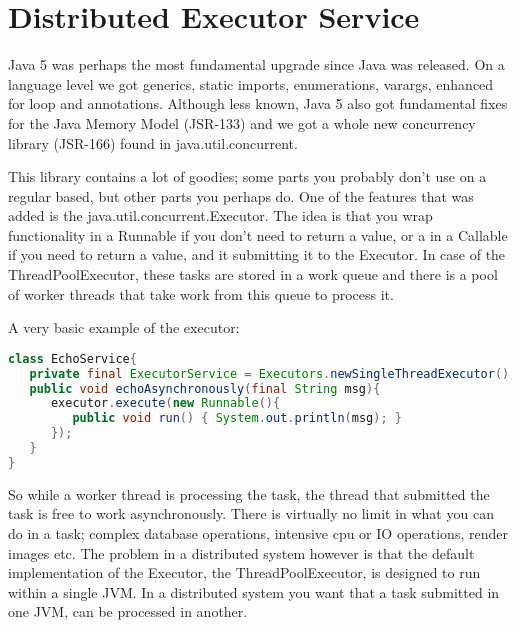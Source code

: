 \chapter{Distributed Executor Service}
Java 5 was perhaps the most fundamental upgrade since Java was released. On a language level we got generics, static imports, enumerations, varargs, enhanced for loop and annotations. Although less known, Java 5 also got fundamental fixes for the Java Memory Model (JSR-133) and we got a whole new concurrency library (JSR-166) found in java.util.concurrent.

This library contains a lot of goodies; some parts you probably don't use on a regular based, but other parts you perhaps do. One of the features that was added is the java.util.concurrent.Executor. The idea is that you wrap functionality in a Runnable if you don't need to return a value, or a in a Callable if you need to return a value, and it submitting it to the Executor. In case of the ThreadPoolExecutor, these tasks are stored in a work queue and there is a pool of worker threads that take work from this queue to process it.

A very basic example of the executor:
\begin{lstlisting}[language=java]
class EchoService{
   private final ExecutorService = Executors.newSingleThreadExecutor();
   public void echoAsynchronously(final String msg){
      executor.execute(new Runnable(){
         public void run() { System.out.println(msg); }
      });	
   }
}
\end{lstlisting}
So while a worker thread is processing the task, the thread that submitted the task is free to work asynchronously. There is virtually no limit in what you can do in a task; complex database operations, intensive cpu or IO operations, render images etc. The problem in a distributed system however is that the default implementation of the Executor, the ThreadPoolExecutor, is designed to run within a single JVM. In a distributed system you want that a task submitted in one JVM, can be processed in another. 

